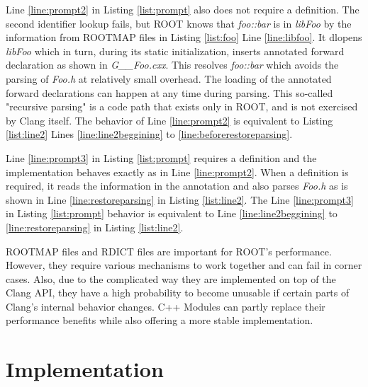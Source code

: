 \documentclass{webofc}
\begin{document}
Line \ref{line:prompt2} in Listing \ref{list:prompt} also does not require a definition. The second identifier lookup fails, but ROOT knows that {\it foo::bar} is in {\it libFoo} by the information from ROOTMAP files in Listing \ref{list:foo} Line \ref{line:libfoo}. It dlopens {\it libFoo} which in turn, during its static initialization, inserts annotated forward declaration as shown in {\it G\_\_Foo.cxx}. This resolves {\it foo::bar} which avoids the parsing of {\it Foo.h} at relatively small overhead. The loading of the annotated forward declarations can happen at any time during parsing. This so-called "recursive parsing" is a code path that exists only in ROOT, and is not exercised by Clang itself. The behavior of Line \ref{line:prompt2} is equivalent to Listing \ref{list:line2} Lines \ref{line:line2beggining} to \ref{line:beforerestoreparsing}.

Line \ref{line:prompt3} in Listing \ref{list:prompt} requires a definition and the implementation behaves exactly as in Line \ref{line:prompt2}. When a definition is required, it reads the information in the annotation and also parses {\it Foo.h} as is shown in Line \ref{line:restoreparsing} in Listing \ref{list:line2}. The Line \ref{line:prompt3} in Listing \ref{list:prompt} behavior is equivalent to Line \ref{line:line2beggining} to \ref{line:restoreparsing} in Listing \ref{list:line2}.

ROOTMAP files and RDICT files are important for ROOT's performance. However, they require various mechanisms to work together and can fail in corner cases. Also, due to the complicated way they are implemented on top of the Clang API, they have a high probability to become unusable if certain parts of Clang's internal behavior changes. C++ Modules can partly replace their performance benefits while also offering a more stable implementation.

\section{Implementation}
\label{implementation}
\end{document}
